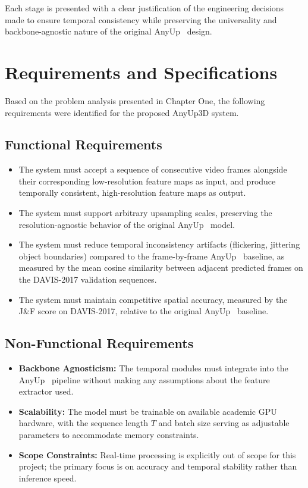 Each stage is presented with a clear justification of the engineering decisions made
to ensure temporal consistency while preserving the universality and
backbone-agnostic nature of the original AnyUp~\cite{anyup} design.

\section{Requirements and Specifications}
Based on the problem analysis presented in Chapter One, the following requirements were identified for the proposed AnyUp3D system.

\subsection{Functional Requirements}
\begin{itemize}
    \item The system must accept a sequence of consecutive video frames alongside their 
    corresponding low-resolution feature maps as input, and produce temporally consistent, 
    high-resolution feature maps as output.
    \item The system must support arbitrary upsampling scales, preserving the resolution-agnostic behavior of the original AnyUp~\cite{anyup} model.
    \item The system must reduce temporal inconsistency artifacts (flickering, jittering object boundaries) compared to the frame-by-frame AnyUp~\cite{anyup} baseline, as measured by the mean cosine similarity between adjacent predicted frames on the DAVIS-2017 validation sequences.
    \item The system must maintain competitive spatial accuracy, measured by the J\&F score on DAVIS-2017, relative to the original AnyUp~\cite{anyup} baseline.

\end{itemize}

\subsection{Non-Functional Requirements}
\begin{itemize}
    \item \textbf{Backbone Agnosticism:} The temporal modules must integrate into the AnyUp~\cite{anyup} pipeline without making any assumptions about the feature extractor used.
    \item \textbf{Scalability:} The model must be trainable on available academic GPU hardware, with the sequence length $T$ and batch size serving as adjustable parameters to accommodate memory constraints.
    \item \textbf{Scope Constraints:} Real-time processing is explicitly out of scope for this project; the primary focus is on accuracy and temporal stability rather than inference speed.
\end{itemize}

